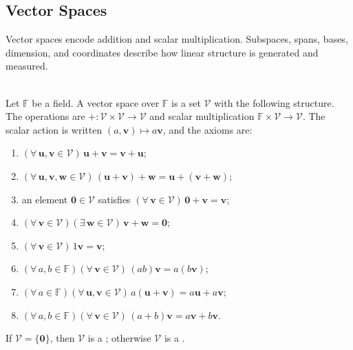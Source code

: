 \subsection{Vector Spaces}

%

Vector spaces encode addition and scalar multiplication. Subspaces, spans, bases, dimension, and coordinates describe how linear structure is generated and measured.


\begin{definition} \label{def:vector-space} \\
\leanok Let $\mathbb{F}$ be a field. A vector space over $\mathbb{F}$ is a set $\mathcal{V}$ with the following structure.\\
The operations are $+\colon\mathcal{V}\times\mathcal{V}\to\mathcal{V}$ and scalar multiplication $\mathbb{F}\times\mathcal{V}\to\mathcal{V}$. The scalar action is written $(a,\mathbf{v})\mapsto a\mathbf{v}$, and the axioms are:
\begin{enumerate}[label=(\roman*)]
\setlength{\itemsep}{0pt}
\item $(\forall\,\mathbf{u},\mathbf{v}\in\mathcal{V})\,\mathbf{u}+\mathbf{v}=\mathbf{v}+\mathbf{u}$;
\item $(\forall\,\mathbf{u},\mathbf{v},\mathbf{w}\in\mathcal{V})\,(\mathbf{u}+\mathbf{v})+\mathbf{w}=\mathbf{u}+(\mathbf{v}+\mathbf{w})$;
\item an element $\mathbf{0}\in\mathcal{V}$ satisfies $(\forall\,\mathbf{v}\in\mathcal{V})\,\mathbf{0}+\mathbf{v}=\mathbf{v}$;
\item $(\forall\,\mathbf{v}\in\mathcal{V})(\exists\,\mathbf{w}\in\mathcal{V})\,\mathbf{v}+\mathbf{w}=\mathbf{0}$;
\item $(\forall\,\mathbf{v}\in\mathcal{V})\,1\mathbf{v}=\mathbf{v}$;
\item $(\forall\,a,b\in\mathbb{F})(\forall\,\mathbf{v}\in\mathcal{V})\,(ab)\mathbf{v}=a(b\mathbf{v})$;
\item $(\forall\,a\in\mathbb{F})(\forall\,\mathbf{u},\mathbf{v}\in\mathcal{V})\,a(\mathbf{u}+\mathbf{v})=a\mathbf{u}+a\mathbf{v}$;
\item $(\forall\,a,b\in\mathbb{F})(\forall\,\mathbf{v}\in\mathcal{V})\,(a+b)\mathbf{v}=a\mathbf{v}+b\mathbf{v}$.
\end{enumerate}
If $\mathcal{V}=\{\mathbf{0}\}$, then $\mathcal{V}$ is a ; otherwise $\mathcal{V}$ is a .
\end{definition}

